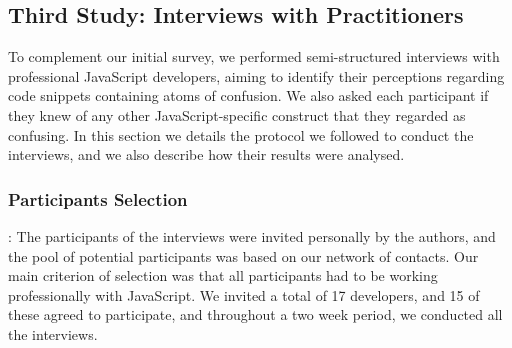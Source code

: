 \subsection{Third Study: Interviews with Practitioners}

To complement our initial survey, we performed semi-structured interviews with professional JavaScript developers, aiming to identify their perceptions regarding code snippets containing atoms of confusion. We also asked each participant if they knew of any other JavaScript-specific construct that they regarded as confusing. In this section we details the protocol we followed to conduct the interviews, and we also describe how their results were analysed.


\subsubsection{Participants Selection}: The participants of the interviews were invited personally by the authors, and the pool of potential participants was based on our network of contacts. Our main criterion of selection was that all participants had to be working professionally with JavaScript. We invited a total of 17 developers, and 15 of these agreed to participate, and throughout a two week period, we conducted all the interviews.


